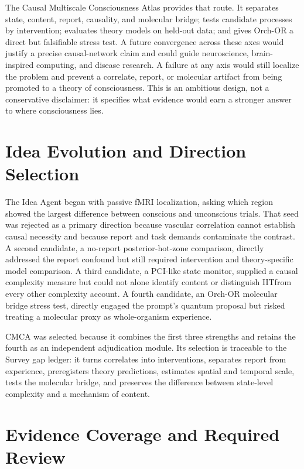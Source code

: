 \documentclass[conference]{IEEEtran}
\newcommand{\IIT}{\textsc{IIT}}
\begin{document}
The Causal Multiscale Consciousness Atlas provides that route. It separates state, content, report, causality, and molecular bridge; tests candidate processes by intervention; evaluates theory models on held-out data; and gives Orch-OR a direct but falsifiable stress test. A future convergence across these axes would justify a precise causal-network claim and could guide neuroscience, brain-inspired computing, and disease research. A failure at any axis would still localize the problem and prevent a correlate, report, or molecular artifact from being promoted to a theory of consciousness. This is an ambitious design, not a conservative disclaimer: it specifies what evidence would earn a stronger answer to where consciousness lies.

\appendices
\section{Idea Evolution and Direction Selection}

The Idea Agent began with passive fMRI localization, asking which region showed the largest difference between conscious and unconscious trials. That seed was rejected as a primary direction because vascular correlation cannot establish causal necessity and because report and task demands contaminate the contrast. A second candidate, a no-report posterior-hot-zone comparison, directly addressed the report confound but still required intervention and theory-specific model comparison. A third candidate, a PCI-like state monitor, supplied a causal complexity measure but could not alone identify content or distinguish \IIT from every other complexity account. A fourth candidate, an Orch-OR molecular bridge stress test, directly engaged the prompt's quantum proposal but risked treating a molecular proxy as whole-organism experience.

CMCA was selected because it combines the first three strengths and retains the fourth as an independent adjudication module. Its selection is traceable to the Survey gap ledger: it turns correlates into interventions, separates report from experience, preregisters theory predictions, estimates spatial and temporal scale, tests the molecular bridge, and preserves the difference between state-level complexity and a mechanism of content.

\section{Evidence Coverage and Required Review}
\end{document}
